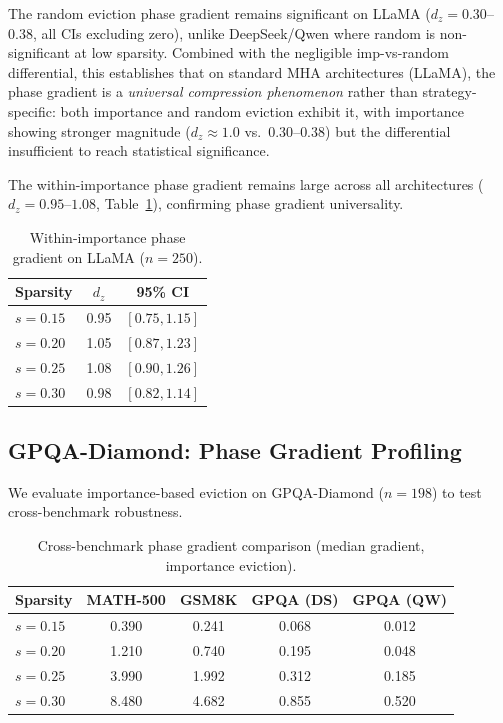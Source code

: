 \documentclass[11pt,a4paper]{article}
\begin{document}
The random eviction phase gradient remains significant on LLaMA ($d_z = 0.30$--$0.38$, all CIs excluding zero), unlike DeepSeek/Qwen where random is non-significant at low sparsity. Combined with the negligible imp-vs-random differential, this establishes that on standard MHA architectures (LLaMA), the phase gradient is a \emph{universal compression phenomenon} rather than strategy-specific: both importance and random eviction exhibit it, with importance showing stronger magnitude ($d_z \approx 1.0$ vs.\ $0.30$--$0.38$) but the differential insufficient to reach statistical significance.

The within-importance phase gradient remains large across all architectures ($d_z = 0.95$--$1.08$, Table~\ref{tab:llama_imp_gradient}), confirming phase gradient universality.

\begin{table}[h]
\centering
\small
\caption{Within-importance phase gradient on LLaMA ($n=250$).}
\begin{tabular}{lcc}
\toprule
Sparsity & $d_z$ & 95\% CI \\
\midrule
$s=0.15$ & 0.95 & $[0.75, 1.15]$ \\
$s=0.20$ & 1.05 & $[0.87, 1.23]$ \\
$s=0.25$ & 1.08 & $[0.90, 1.26]$ \\
$s=0.30$ & 0.98 & $[0.82, 1.14]$ \\
\bottomrule
\end{tabular}
\label{tab:llama_imp_gradient}
\end{table}

\subsection{GPQA-Diamond: Phase Gradient Profiling}

We evaluate importance-based eviction on GPQA-Diamond ($n=198$) to test cross-benchmark robustness.

\begin{table}[h]
\centering
\small
\caption{Cross-benchmark phase gradient comparison (median gradient, importance eviction).}
\begin{tabular}{lcccc}
\toprule
Sparsity & MATH-500 & GSM8K & GPQA (DS) & GPQA (QW) \\
\midrule
$s=0.15$ & 0.390 & 0.241 & 0.068 & 0.012 \\
$s=0.20$ & 1.210 & 0.740 & 0.195 & 0.048 \\
$s=0.25$ & 3.990 & 1.992 & 0.312 & 0.185 \\
$s=0.30$ & 8.480 & 4.682 & 0.855 & 0.520 \\
\bottomrule
\end{tabular}
\label{tab:cross_benchmark}
\end{table}
\end{document}
